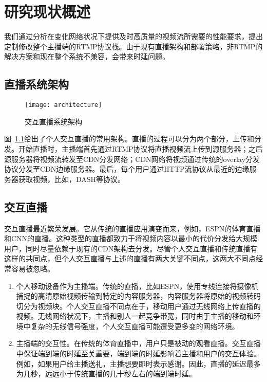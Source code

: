 \chapter{研究现状概述}
我们通过分析在变化网络状况下提供及时高质量的视频流所需要的性能要求，提出定制修改整个主播端的RTMP协议栈。由于现有直播架构和部署策略，非RTMP的解决方案和现在整个系统不兼容，会带来时延问题。

\section{直播系统架构}

\begin{figure}[H]%
  \centering
  \texttt{[image: architecture]}
  \caption{交互直播系统架构}
  \label{fig:architecture}
\end{figure}

图~\ref{fig:architecture}给出了个人交互直播的常用架构。直播的过程可以分为两个部分，上传和分发。开始直播时，主播端首先通过RTMP协议将直播视频流上传到源服务器；之后源服务器将视频流转发至CDN分发网络；CDN网络将视频通过传统的overlay分发协议分发至CDN边缘服务器。最后，每个用户通过HTTP流协议从最近的边缘服务器获取视频，比如，DASH等协议。

\section{交互直播}
交互直播最近繁荣发展。它从传统的直播应用演变而来，例如，ESPN的体育直播和CNN的直播。这种类型的直播都致力于将视频内容以最小的代价分发给大规模用户，同时尽量依赖于现有的CDN架构去分发。尽管个人交互直播和传统直播有这样的共同点，但个人交互直播与上述的直播有两大关键不同点，这两大不同点经常容易被忽略。
\begin{enumerate}
  \item 个人移动设备作为主播端。传统的直播，比如ESPN，使用专线连接将摄像机捕捉的高清原始视频传输到特定的内容服务器，内容服务器将原始的视频转码切分为视频块。个人交互直播不同点在于，移动用户通过无线网络上传直播的视频。无线网络状况下，主播和别人一起竞争带宽，同时由于主播的移动和环境中复杂的无线信号强度，个人交互直播可能遭受更多变的网络环境。
  \item 主播端的交互性。在传统的体育直播中，用户只是被动的观看直播。交互直播中保证端到端的时延至关重要，端到端的时延影响着主播和用户的交互体验。例如，如果用户给主播送礼，主播想要即时表示感谢。因此，直播的延迟最多为几秒，远远小于传统直播的几十秒左右的端到端时延。
\end{enumerate}

